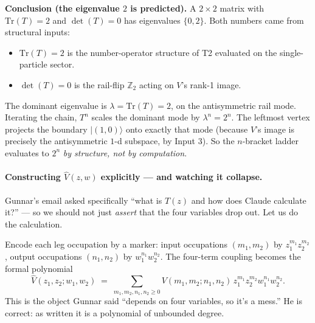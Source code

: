 \documentclass[11pt,a4paper]{article}
\begin{document}
\bigskip
\noindent\textbf{Conclusion (the eigenvalue $2$ is predicted).}
A $2{\times}2$ matrix with $\mathrm{Tr}(T)=2$ and $\det(T)=0$ has eigenvalues $\{0,2\}$. Both numbers came from structural inputs:
\begin{itemize}[leftmargin=2em,itemsep=1pt]
  \item $\mathrm{Tr}(T)=2$ is the number-operator structure of T2 evaluated on the single-particle sector.
  \item $\det(T)=0$ is the rail-flip $\mathbb{Z}_2$ acting on $V$'s rank-1 image.
\end{itemize}
The dominant eigenvalue is $\lambda = \mathrm{Tr}(T) = 2$, on the antisymmetric rail mode. Iterating the chain, $T^n$ scales the dominant mode by $\lambda^n = 2^n$. The leftmost vertex projects the boundary $|(1,0)\rangle$ onto exactly that mode (because $V$'s image is precisely the antisymmetric $1$-d subspace, by Input 3). So the $n$-bracket ladder evaluates to $2^n$ \emph{by structure, not by computation}.

\paragraph{Constructing $\widehat V(z,w)$ explicitly --- and watching it collapse.}
Gunnar's email asked specifically ``what is $T(z)$ and how does Claude calculate it?'' --- so we should not just \emph{assert} that the four variables drop out. Let us do the calculation.

Encode each leg occupation by a marker: input occupations $(m_1,m_2)$ by $z_1^{m_1}z_2^{m_2}$, output occupations $(n_1,n_2)$ by $w_1^{n_1}w_2^{n_2}$. The four-term coupling becomes the formal polynomial
\[
\widehat V(z_1,z_2;w_1,w_2) \;=\; \sum_{m_1,m_2,n_1,n_2\ge 0} V(m_1,m_2;n_1,n_2)\, z_1^{m_1}z_2^{m_2}w_1^{n_1}w_2^{n_2}.
\]
This is the object Gunnar said ``depends on four variables, so it's a mess.'' He is correct: as written it is a polynomial of unbounded degree.
\end{document}
